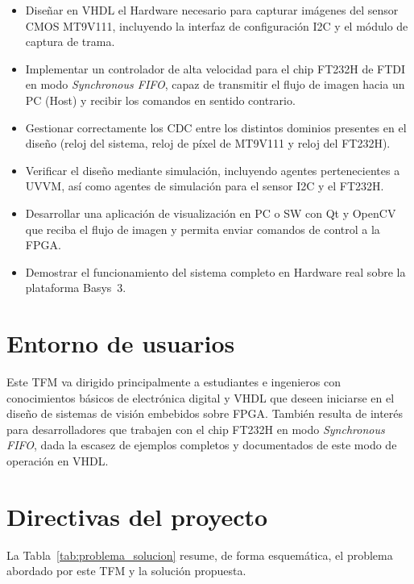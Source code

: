 \documentclass[../main.tex]{subfiles}
\begin{document}
\begin{itemize}
    \item Diseñar en \ac{VHDL} el Hardware necesario para capturar imágenes del sensor CMOS MT9V111, incluyendo la interfaz de configuración I2C y el módulo de captura de trama.
    \item Implementar un controlador de alta velocidad para el chip FT232H de FTDI en modo \textit{Synchronous \ac{FIFO}}, capaz de transmitir el flujo de imagen hacia un PC (Host) y recibir los comandos en sentido contrario.
    \item Gestionar correctamente los \ac{CDC} entre los distintos dominios presentes en el diseño (reloj del sistema, reloj de píxel de MT9V111 y reloj del FT232H).
    \item Verificar el diseño mediante simulación, incluyendo agentes pertenecientes a \ac{UVVM}, así como agentes de simulación para el sensor I2C y el FT232H.
    \item Desarrollar una aplicación de visualización en PC o \ac{SW} con Qt y OpenCV que reciba el flujo de imagen y permita enviar comandos de control a la \ac{FPGA}.
    \item Demostrar el funcionamiento del sistema completo en Hardware real sobre la plataforma Basys~3.
\end{itemize}

\section{Entorno de usuarios}

Este \ac{TFM} va dirigido principalmente a estudiantes e ingenieros con conocimientos básicos de electrónica digital y \ac{VHDL} que deseen iniciarse en el diseño de sistemas de visión embebidos sobre \ac{FPGA}. También resulta de interés para desarrolladores que trabajen con el chip FT232H en modo \textit{Synchronous FIFO}, dada la escasez de ejemplos completos y documentados de este modo de operación en \ac{VHDL}.

\section{Directivas del proyecto}

La Tabla~\ref{tab:problema_solucion} resume, de forma esquemática, el problema abordado por este \ac{TFM} y la solución propuesta.
\end{document}
